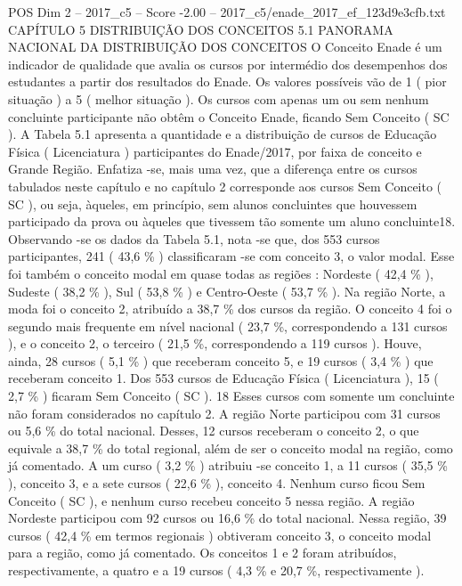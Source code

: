 \begin{textsample}{POS Dim 2 – 2017\_c5 – Score -2.00 – 2017\_c5/enade\_2017\_ef\_123d9e3cfb.txt}  \label{ex:f2_pos_390}
CAPÍTULO 5 DISTRIBUIÇÃO DOS CONCEITOS 5.1 PANORAMA NACIONAL DA DISTRIBUIÇÃO DOS CONCEITOS O Conceito Enade é um indicador de qualidade que avalia os cursos por intermédio dos desempenhos dos estudantes a partir dos resultados do Enade.
Os valores possíveis vão de 1 ( pior situação ) a 5 ( melhor situação ).
Os cursos com apenas um ou sem nenhum concluinte participante não obtêm o Conceito Enade, ficando Sem Conceito ( SC ).
A Tabela 5.1 apresenta a quantidade e a distribuição de cursos de Educação Física ( Licenciatura ) participantes do Enade/2017, por faixa de conceito e Grande Região.
Enfatiza -se, mais uma vez, que a diferença entre os cursos tabulados neste capítulo e no capítulo 2 corresponde aos cursos Sem Conceito ( SC ), ou seja, àqueles, em princípio, sem alunos concluintes que houvessem participado da prova ou àqueles que tivessem tão somente um aluno concluinte18.
Observando -se os dados da Tabela 5.1, nota -se que, dos 553 cursos participantes, 241 ( 43,6 \% ) classificaram -se com conceito 3, o valor modal.
Esse foi também o conceito modal em quase todas as regiões : Nordeste ( 42,4 \% ), Sudeste ( 38,2 \% ), Sul ( 53,8 \% ) e Centro-Oeste ( 53,7 \% ).
Na região Norte, a moda foi o conceito 2, atribuído a 38,7 \% dos cursos da região.
O conceito 4 foi o segundo mais frequente em nível nacional ( 23,7 \%, correspondendo a 131 cursos ), e o conceito 2, o terceiro ( 21,5 \%, correspondendo a 119 cursos ).
Houve, ainda, 28 cursos ( 5,1 \% ) que receberam conceito 5, e 19 cursos ( 3,4 \% ) que receberam conceito 1.
Dos 553 cursos de Educação Física ( Licenciatura ), 15 ( 2,7 \% ) ficaram Sem Conceito ( SC ). 18 Esses cursos com somente um concluinte não foram considerados no capítulo 2.
A região Norte participou com 31 cursos ou 5,6 \% do total nacional.
Desses, 12 cursos receberam o conceito 2, o que equivale a 38,7 \% do total regional, além de ser o conceito modal na região, como já comentado.
A um curso ( 3,2 \% ) atribuiu -se conceito 1, a 11 cursos ( 35,5 \% ), conceito 3, e a sete cursos ( 22,6 \% ), conceito 4.
Nenhum curso ficou Sem Conceito ( SC ), e nenhum curso recebeu conceito 5 nessa região.
A região Nordeste participou com 92 cursos ou 16,6 \% do total nacional.
Nessa região, 39 cursos ( 42,4 \% em termos regionais ) obtiveram conceito 3, o conceito modal para a região, como já comentado.
Os conceitos 1 e 2 foram atribuídos, respectivamente, a quatro e a 19 cursos ( 4,3 \% e 20,7 \%, respectivamente ).

\end{textsample}

